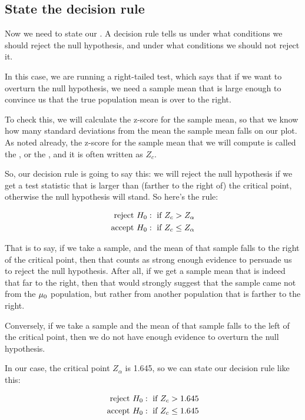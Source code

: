 \documentclass[../../../main.tex]{subfiles}
\begin{document}
\subsection{State the decision rule}

Now we need to state our . A decision rule tells us under what conditions we should reject the null hypothesis, and under what conditions we should not reject it.

In this case, we are running a right-tailed test, which says that if we want to overturn the null hypothesis, we need a sample mean that is large enough to convince us that the true population mean is over to the right. 

To check this, we will calculate the z-score for the sample mean, so that we know how many standard deviations from the mean the sample mean falls on our plot. As noted already, the z-score for the sample mean that we will compute is called the , or the , and it is often written as $Z_{c}$.

So, our decision rule is going to say this: we will reject the null hypothesis if we get a test statistic that is larger than (farther to the right of) the critical point, otherwise the null hypothesis will stand. So here's the rule:

\begin{align*}
  \text{reject } \NullHyp/: \text{ if } Z_{c} > Z_{\alpha} \\
  \text{accept } \NullHyp/: \text{ if } Z_{c} \leq Z_{\alpha}
\end{align*}

\noindent
That is to say, if we take a sample, and the mean of that sample falls to the right of the critical point, then that counts as strong enough evidence to persuade us to reject the null hypothesis. After all, if we get a sample mean that is indeed that far to the right, then that would strongly suggest that the sample came not from the $\HypPopMean/$ population, but rather from another population that is farther to the right.

Conversely, if we take a sample and the mean of that sample falls to the left of the critical point, then we do not have enough evidence to overturn the null hypothesis. 

In our case, the critical point $Z_{\alpha}$ is 1.645, so we can state our decision rule like this:

\begin{align*}
  \text{reject } \NullHyp/: \text{ if } Z_{c} > 1.645 \\
  \text{accept } \NullHyp/: \text{ if } Z_{c} \leq 1.645
\end{align*}
\end{document}
